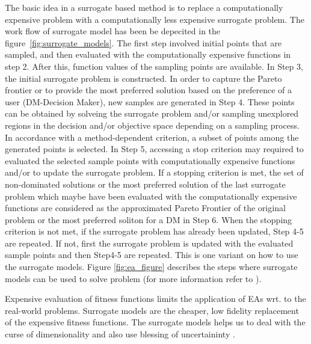 \documentclass{newsig}
\begin{document}
The basic idea in a surrogate based method is to replace a computationally expensive problem with a computationally less expensive surrogate problem. The work flow of surrogate model has been be depecited in the figure~\ref{fig:surrogate_models}. 
The first step involved initial points that are sampled, and then evaluated with the computationally expensive functions in step 2. After this, function values of the sampling points are available. In Step 3, the initial surrogate problem is constructed. In order to capture the Pareto frontier or to provide the most preferred solution based on the preference of a user (DM-Decision Maker), new samples are generated in Step 4. These points can be obtained by solveing the surrogate problem and/or sampling unexplored regions in the decision and/or objective space depending on a sampling process. In accordance with a method-dependent criterion, a subset of points among the generated points is selected. In Step 5, accessing a stop criterion may required to evaluated the selected sample points with computationally expensive functions and/or to update the surrogate problem. If a stopping criterion is met, the set of non-dominated solutions or the most preferred solution of the last surrogate problem which maybe have been evaluated with the computationally  expensive functions are considered as the approximated Pareto Frontier of the original problem or the most preferred soliton for a DM in Step 6. When the stopping criterion is not met, if the surrogate problem has already been updated, Step 4-5 are repeated. If not, first the surrogate problem is updated with the evaluated sample points and then Step4-5 are repeated. This is one variant on how to use the surrogate models. Figure \ref{fig:ea_figure} describes the steps where surrogate models can be used to solve problem (for more information refer to \cite{rasheed2000informed}).

\begin{myshadowbox}
Expensive evaluation of fitness functions limits the application of EAs wrt. to the real-world problems. Surrogate models are the cheaper, low fidelity replacement of the expensive fitness functions. The surrogate models helps us to deal with the \textquotesingle curse of dimensionality \textquotesingle and also use \textquotesingle blessing of uncertaininty \textquotesingle.
\end{myshadowbox}
 
 
\end{document}
